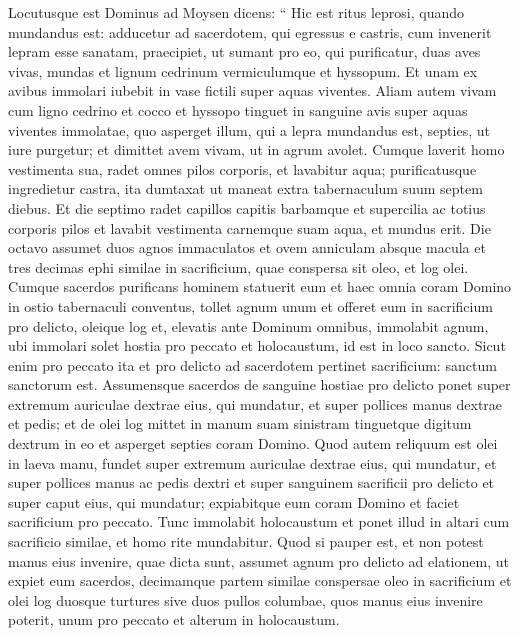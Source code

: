 \begin{biblechapter}
\begin{biblechapter}
\begin{biblechapter}
\begin{biblechapter}
\begin{biblechapter}
\begin{biblechapter}
\begin{biblechapter}
\begin{biblechapter}
\begin{biblechapter}
\begin{biblechapter}
\begin{biblechapter}
\begin{biblechapter}
\begin{biblechapter}
\begin{biblechapter}
\verse Locutusque est Dominus ad Moysen dicens: 
\verse “ Hic est ritus leprosi, quando mundandus est: adducetur ad sacerdotem, 
\verse qui egressus e castris, cum invenerit lepram esse sanatam, 
\verse praecipiet, ut sumant pro eo, qui purificatur, duas aves vivas, mundas et lignum cedrinum vermiculumque et hyssopum. 
\verse Et unam ex avibus immolari iubebit in vase fictili super aquas viventes. 
\verse Aliam autem vivam cum ligno cedrino et cocco et hyssopo tinguet in sanguine avis super aquas viventes immolatae, 
\verse quo asperget illum, qui a lepra mundandus est, septies, ut iure purgetur; et dimittet avem vivam, ut in agrum avolet. 
\verse Cumque laverit homo vestimenta sua, radet omnes pilos corporis, et lavabitur aqua; purificatusque ingredietur castra, ita dumtaxat ut maneat extra tabernaculum suum septem diebus. 
\verse Et die septimo radet capillos capitis barbamque et supercilia ac totius corporis pilos et lavabit vestimenta carnemque suam aqua, et mundus erit.
 \verse Die octavo assumet duos agnos immaculatos et ovem anniculam absque macula et tres decimas ephi similae in sacrificium, quae conspersa sit oleo, et log olei. 
\verse Cumque sacerdos purificans hominem statuerit eum et haec omnia coram Domino in ostio tabernaculi conventus, 
\verse tollet agnum unum et offeret eum in sacrificium pro delicto, oleique log et, elevatis ante Dominum omnibus, 
 \verse immolabit agnum, ubi immolari solet hostia pro peccato et holocaustum, id est in loco sancto. Sicut enim pro peccato ita et pro delicto ad sacerdotem pertinet sacrificium: sanctum sanctorum est. 
\verse Assumensque sacerdos de sanguine hostiae pro delicto ponet super extremum auriculae dextrae eius, qui mundatur, et super pollices manus dextrae et pedis; 
\verse et de olei log mittet in manum suam sinistram 
\verse tinguetque digitum dextrum in eo et asperget septies coram Domino. 
\verse Quod autem reliquum est olei in laeva manu, fundet super extremum auriculae dextrae eius, qui mundatur, et super pollices manus ac pedis dextri et super sanguinem sacrificii pro delicto 
\verse et super caput eius, qui mundatur; expiabitque eum coram Domino 
\verse et faciet sacrificium pro peccato. Tunc immolabit holocaustum 
\verse et ponet illud in altari cum sacrificio similae, et homo rite mundabitur.
 \verse Quod si pauper est, et non potest manus eius invenire, quae dicta sunt, assumet agnum pro delicto ad elationem, ut expiet eum sacerdos, decimamque partem similae conspersae oleo in sacrificium et olei log 
\verse duosque turtures sive duos pullos columbae, quos manus eius invenire poterit, unum pro peccato et alterum in holocaustum. 

\end{biblechapter}
\end{biblechapter}
\end{biblechapter}
\end{biblechapter}
\end{biblechapter}
\end{biblechapter}
\end{biblechapter}
\end{biblechapter}
\end{biblechapter}
\end{biblechapter}
\end{biblechapter}
\end{biblechapter}
\end{biblechapter}
\end{biblechapter}
